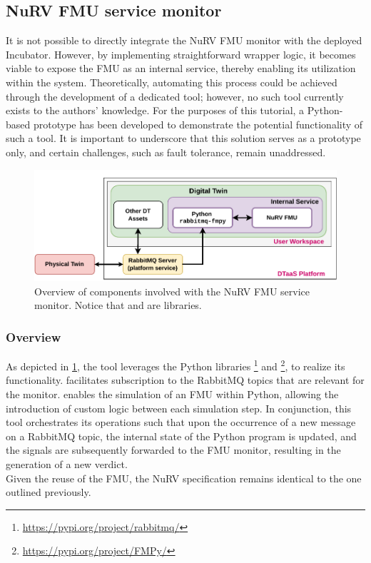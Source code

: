\subsection{NuRV FMU service monitor}\label{subsec:NuRVsermoni}
It is not possible to directly integrate the NuRV FMU monitor with the deployed Incubator.
However, by implementing straightforward wrapper logic, it becomes viable to expose the FMU as an internal service, thereby enabling its utilization within the system.
Theoretically, automating this process could be achieved through the development of a dedicated tool; however, no such tool currently exists to the authors' knowledge.
For the purposes of this tutorial, a Python-based prototype has been developed to demonstrate the potential functionality of such a tool.
It is important to underscore that this solution serves as a prototype only, and certain challenges, such as fault tolerance, remain unaddressed.%
%
\begin{figure}[ht]
	\centering
	\includegraphics[width=\columnwidth]{images/NuRV-FMU-integration.pdf}
	\caption{Overview of components involved with the NuRV FMU service monitor. Notice that  and  are libraries.}
	\label{fig:nurv-fmu-service}
\end{figure}%
%
\subsubsection{Overview}
As depicted in \cref{fig:nurv-fmu-service}, the tool leverages the Python libraries \footnote{\url{https://pypi.org/project/rabbitmq/}} and \footnote{\url{https://pypi.org/project/FMPy/}}, to realize its functionality.
 facilitates subscription to the RabbitMQ topics that are relevant for the monitor.
 enables the simulation of an FMU within Python, allowing the introduction of custom logic between each simulation step.
In conjunction, this tool orchestrates its operations such that upon the occurrence of a new message on a RabbitMQ topic, the internal state of the Python program is updated, and the signals are subsequently forwarded to the FMU monitor, resulting in the generation of a new verdict.\\
Given the reuse of the FMU, the NuRV specification remains identical to the one outlined previously.

